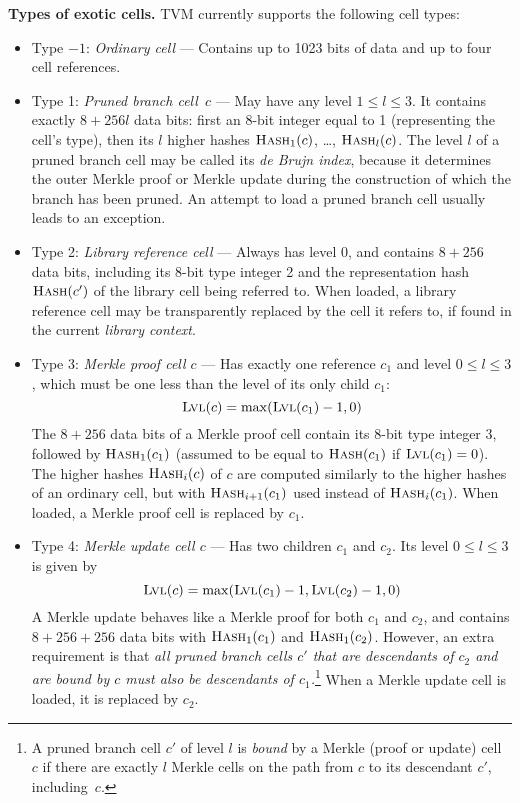 \documentclass[12pt,oneside]{article}
\def\makepoint#1{\medbreak\noindent{\bf #1.\ }}
\def\nxsubpoint{\refstepcounter{subsubsection}%
  \smallbreak\makepoint{\thesubsubsection}}
\def\emb#1{\textbf{#1.}}
\def\opsc#1{\operatorname{\textsc{#1}}}
\def\Hash{\opsc{Hash}}
\def\Lvl{\opsc{Lvl}}
\begin{document}
\nxsubpoint\label{sp:exotic.cell.types}\emb{Types of exotic cells}
TVM currently supports the following cell types:
\begin{itemize}
\item Type $-1$: {\em Ordinary cell} --- Contains up to 1023 bits of data and up to four cell references.
\item Type 1: {\em Pruned branch cell~$c$} --- May have any level $1\leq l\leq 3$. It contains exactly $8+256l$ data bits: first an 8-bit integer equal to 1 (representing the cell's type), then its $l$ higher hashes $\Hash_1(c)$, \dots, $\Hash_l(c)$. The level $l$ of a pruned branch cell may be called its {\em de Brujn index}, because it determines the outer Merkle proof or Merkle update during the construction of which the branch has been pruned. An attempt to load a pruned branch cell usually leads to an exception.
\item Type 2: {\em Library reference cell} --- Always has level 0, and contains $8+256$ data bits, including its 8-bit type integer 2 and the representation hash $\Hash(c')$ of the library cell being referred to. When loaded, a library reference cell may be transparently replaced by the cell it refers to, if found in the current {\em library context}.
\item Type 3: {\em Merkle proof cell $c$} --- Has exactly one reference $c_1$ and level $0\leq l\leq 3$, which must be one less than the level of its only child $c_1$:
\begin{equation}
  \Lvl(c)=\max(\Lvl(c_1)-1,0)
\end{equation}
The $8+256$ data bits of a Merkle proof cell contain its 8-bit type integer 3, followed by $\Hash_1(c_1)$ (assumed to be equal to $\Hash(c_1)$ if $\Lvl(c_1)=0$). The higher hashes $\Hash_i(c)$ of $c$ are computed similarly to the higher hashes of an ordinary cell, but with $\Hash_{i+1}(c_1)$ used instead of $\Hash_i(c_1)$. When loaded, a Merkle proof cell is replaced by $c_1$.
\item Type 4: {\em Merkle update cell $c$} --- Has two children $c_1$ and $c_2$. Its level $0\leq l\leq 3$ is given by
\begin{equation}
  \Lvl(c)=\max(\Lvl(c_1)-1,\Lvl(c_2)-1,0)
\end{equation}
A Merkle update behaves like a Merkle proof for both $c_1$ and $c_2$, and contains $8+256+256$ data bits with $\Hash_1(c_1)$ and $\Hash_1(c_2)$. However, an extra requirement is that {\em all pruned branch cells $c'$ that are descendants of $c_2$ and are bound by $c$ must also be descendants of $c_1$.}\footnote{A pruned branch cell $c'$ of level $l$ is {\em bound\/} by a Merkle (proof or update) cell $c$ if there are exactly $l$ Merkle cells on the path from $c$ to its descendant $c'$, including~$c$.} When a Merkle update cell is loaded, it is replaced by $c_2$.
\end{itemize}
\end{document}
